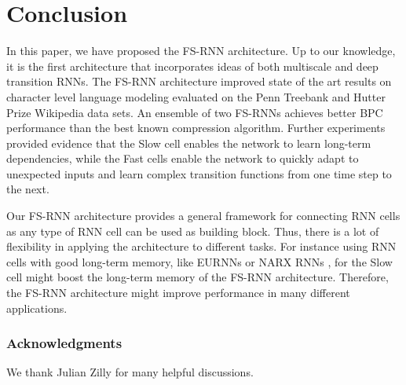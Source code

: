 \documentclass{article}
\begin{document}
 
\section{Conclusion} \label{sec:Conclusions}
In this paper, we have proposed the FS-RNN architecture. Up to our knowledge, it is the first architecture that incorporates ideas of both multiscale and deep transition RNNs. The FS-RNN architecture improved state of the art results on character level language modeling  evaluated  on the  Penn Treebank and Hutter Prize Wikipedia data sets. An ensemble of two FS-RNNs achieves better BPC performance than the best known compression algorithm. Further experiments provided evidence that the Slow  cell enables the network to learn long-term dependencies, while the Fast cells enable the network to quickly adapt to unexpected inputs and learn complex transition functions from one time step to the next. 

Our FS-RNN architecture provides a general framework for connecting RNN cells as any type of RNN cell can be used as building block. Thus, there is a lot of flexibility in applying the architecture to different tasks. For instance using RNN cells with good long-term memory, like EURNNs \cite{jing2016EUNN} or NARX RNNs \cite{lin1996learning, narx2017}, for the Slow cell might boost the long-term memory of the FS-RNN architecture. Therefore, the FS-RNN architecture might improve performance in many different applications.









%
 


\subsubsection*{Acknowledgments}

We thank Julian Zilly for many helpful discussions.
















\begin{footnotesize}


\end{footnotesize}
\end{document}
